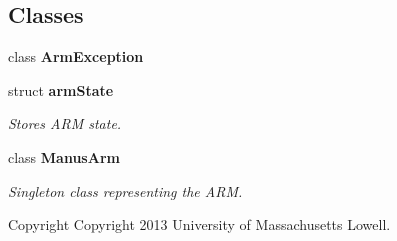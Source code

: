 \subsection*{\-Classes}
\begin{DoxyCompactItemize}
\item 
class {\bf \-Arm\-Exception}
\item 
struct {\bf arm\-State}
\begin{DoxyCompactList}\small\item\em \-Stores \-A\-R\-M state. \end{DoxyCompactList}\item 
class {\bf \-Manus\-Arm}
\begin{DoxyCompactList}\small\item\em \-Singleton class representing the \-A\-R\-M. \begin{DoxyCopyright}{\-Copyright}
\-Copyright 2013 \-University of \-Massachusetts \-Lowell. 
\end{DoxyCopyright}
\end{DoxyCompactList}\end{DoxyCompactItemize}
